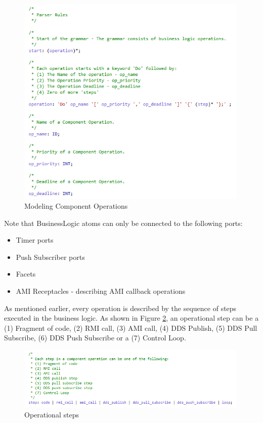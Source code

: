 \begin{figure}[ht]
\centering
\includegraphics[width=0.99\textwidth]{./figs/Grammar_1}
\caption{Modeling Component Operations}
\label{fig:grammar1}
\vspace{-0.2in}
\end{figure}
\vspace{0.1in}

Note that BusinessLogic atoms can only be connected to the following ports: 
\begin{itemize}
\item Timer ports
\item Push Subscriber ports 
\item Facets
\item AMI Receptacles - describing AMI callback operations
\end{itemize}

As mentioned earlier, every operation is described by the sequence of steps executed in the business logic. As shown in Figure \ref{fig:grammar2}, an operational step can be a (1) Fragment of code, (2) RMI call, (3) AMI call, (4) DDS Publish, (5) DDS Pull Subscribe, (6) DDS Push Subscribe or a (7) Control Loop.

\begin{figure}[ht]
\centering
\includegraphics[width=0.99\textwidth]{./figs/Grammar_2}
\caption{Operational steps}
\label{fig:grammar2}
\vspace{-0.2in}
\end{figure}
\vspace{0.1in}

